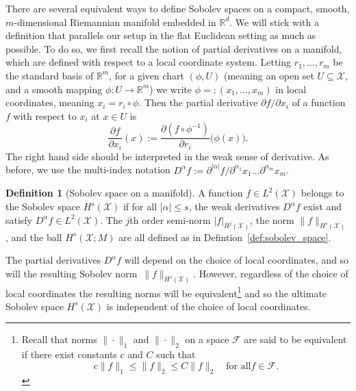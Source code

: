 \documentclass{article}
\newcommand{\Reals}{\mathbb{R}}
\newcommand{\abs}[1]{\left \lvert #1 \right \rvert}
\newcommand{\1}{\mathbf{1}}
\newcommand{\Leb}{L}
\newcommand{\mc}[1]{\mathcal{#1}}
\theoremstyle{alden}
\theoremstyle{aldenthm}
\theoremstyle{definition}
\newtheorem{definition}{Definition}[section]
\theoremstyle{remark}
\begin{document}
There are several equivalent ways to define Sobolev spaces on a compact, smooth, $m$-dimensional Riemannian manifold embedded in $\Reals^d$. We will stick with a definition that parallels our setup in the flat Euclidean setting as much as possible. To do so, we first recall the notion of partial derivatives on a manifold, which are defined with respect to a local coordinate system. Letting $r_1,\ldots,r_m$ be the standard basis of $\Reals^m$, for a given chart $(\phi,U)$ (meaning an open set $U \subseteq \mc{X}$, and a smooth mapping $\phi: U \to \Reals^m$) we write $\phi =: (x_1,\ldots,x_m)$ in local coordinates, meaning $x_i = r_i \circ \phi$. Then the partial derivative $\partial f/\partial x_i$ of a function $f$ with respect to $x_i$ at $x \in U$ is
\begin{equation*}
\frac{\partial f}{\partial x_i}(x) := \frac{\partial(f \circ \phi^{-1})}{\partial r_i}\bigl(\phi(x)\bigr).
\end{equation*}
The right hand side should be interpreted in the weak sense of derivative. As before, we use the multi-index notation $D^{\alpha}f := \partial^{|\alpha|}f/\partial^{\alpha_1}x_1\ldots\partial^{\alpha_m}x_m$. 

\begin{definition}[Sobolev space on a manifold]
	\label{def:sobolev_space_manifold}
	A function $f \in \Leb^2(\mc{X})$ belongs to the Sobolev space $H^{s}(\mc{X})$ if for all $\abs{\alpha} \leq s$, the weak derivatives $D^{\alpha}f$ exist and satisfy  $D^{\alpha}f \in \Leb^2(\mc{X})$. The $j$th order semi-norm $|f|_{H^j(\mc{X})}$, the norm $\|f\|_{H^s(\mc{X})}$, and the ball $H^s(\mc{X};M)$ are all defined as in Defintion~\ref{def:sobolev_space}.
\end{definition}
The partial derivatives $D^{\alpha}f$ will depend on the choice of local coordinates, and so will the resulting Sobolev norm~$\|f\|_{H^s(\mc{X})}$. However, regardless of the choice of local coordinates the resulting norms will be equivalent\footnote{Recall that norms $\|\cdot\|_1$ and $\|\cdot\|_2$ on a space $\mc{F}$ are said to be equivalent if there exist constants $c$ and $C$ such that
\begin{equation*}
c \|f\|_1 \leq \|f\|_2 \leq C \|f\|_2 \quad \textrm{for all} f \in \mc{F}.
\end{equation*}} 
and so the ultimate Sobolev space $H^s(\mc{X})$ is independent of the choice of local coordinates. 
\end{document}
